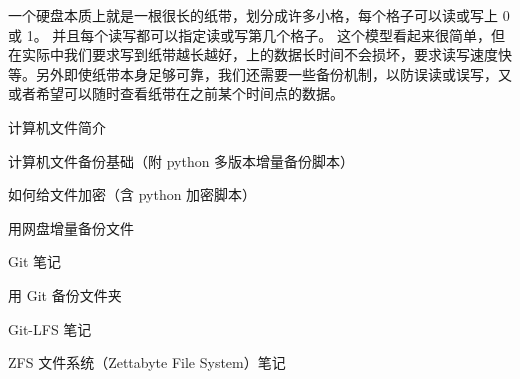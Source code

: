 
一个硬盘本质上就是一根很长的纸带，划分成许多小格，每个格子可以读或写上 0 或 1。 并且每个读写都可以指定读或写第几个格子。 这个模型看起来很简单，但在实际中我们要求写到纸带越长越好，上的数据长时间不会损坏，要求读写速度快等。另外即使纸带本身足够可靠，我们还需要一些备份机制，以防误读或误写，又或者希望可以随时查看纸带在之前某个时间点的数据。

计算机文件简介

计算机文件备份基础（附 python 多版本增量备份脚本）

如何给文件加密（含 python 加密脚本）

用网盘增量备份文件

Git 笔记

用 Git 备份文件夹

Git-LFS 笔记

ZFS 文件系统（Zettabyte File System）笔记
